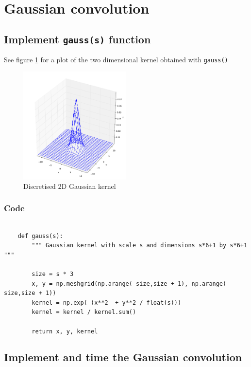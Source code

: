 \documentclass[abstract=true]{scrartcl}
\begin{document}
\section{Gaussian convolution}

    \subsection{Implement \texttt{gauss(s)} function}

        See figure \ref{kernel} for a plot of the two dimensional kernel
        obtained with \texttt{gauss()}

        \begin{figure}
          \centering
          \includegraphics[width=0.5\textwidth]{../images/2_kernel3d}
          \caption{Discretised 2D Gaussian kernel}
          \label{kernel}
        \end{figure}

        \subsubsection{Code}

            \begin{verbatim}
        
    def gauss(s):
        """ Gaussian kernel with scale s and dimensions s*6+1 by s*6+1  """

        size = s * 3
        x, y = np.meshgrid(np.arange(-size,size + 1), np.arange(-size,size + 1))
        kernel = np.exp(-(x**2  + y**2 / float(s)))
        kernel = kernel / kernel.sum()
        
        return x, y, kernel

            \end{verbatim}

    \subsection{Implement and time the Gaussian convolution}
\end{document}
